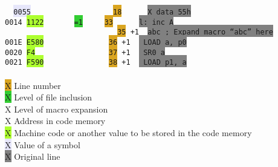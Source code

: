 {                \begin{code}[h]
                        \verb'  '\texttt{\colorbox{Lavender}{0055}}\verb'                   '\texttt{\colorbox{Goldenrod}{18}}\verb'      '\texttt{\colorbox{Gray}{X      data     55h}} \\
                        \texttt{\colorbox{Apricot}{0014}}\verb' '\texttt{\colorbox{GreenYellow}{1122}}\verb'       '\texttt{\colorbox{LimeGreen}{=1}}\verb'     '\texttt{\colorbox{Goldenrod}{33}}\verb'      '\texttt{\colorbox{Gray}{l:     inc      A}} \\
                        \verb'                          '\texttt{\colorbox{Goldenrod}{35}}\verb' '\texttt{\colorbox{ProcessBlue}{+1}}\verb'  '\texttt{\colorbox{Gray}{abc     ; Expand macro ``abc'' here}} \\
                        \texttt{\colorbox{Apricot}{001E}}\verb' '\texttt{\colorbox{GreenYellow}{E580}}\verb'               '\texttt{\colorbox{Goldenrod}{36}}\verb' '\texttt{\colorbox{ProcessBlue}{+1}}\verb'  '\texttt{\colorbox{Gray}{                LOAD     a, p0}} \\
                        \texttt{\colorbox{Apricot}{0020}}\verb' '\texttt{\colorbox{GreenYellow}{F4}}\verb'                 '\texttt{\colorbox{Goldenrod}{37}}\verb' '\texttt{\colorbox{ProcessBlue}{+1}}\verb'  '\texttt{\colorbox{Gray}{                SR0     a}} \\
                        \texttt{\colorbox{Apricot}{0021}}\verb' '\texttt{\colorbox{GreenYellow}{F590}}\verb'               '\texttt{\colorbox{Goldenrod}{38}}\verb' '\texttt{\colorbox{ProcessBlue}{+1}}\verb'  '\texttt{\colorbox{Gray}{                LOAD     p1, a}} \\\\
                        \colorbox{Goldenrod}{\color{Goldenrod}X} Line number \\
                        \colorbox{LimeGreen}{\color{LimeGreen}X} Level of file inclusion \\
                        \colorbox{ProcessBlue}{\color{ProcessBlue}X} Level of macro expansion \\
                        \colorbox{Apricot}{\color{Apricot}X} Address in code memory \\
                        \colorbox{GreenYellow}{\color{GreenYellow}X} Machine code or another value to be stored in the code memory \\
                        \colorbox{Lavender}{\color{Lavender}X} Value of a symbol \\
                        \colorbox{Gray}{\color{Gray}X} Original line \\


\end{code}}
